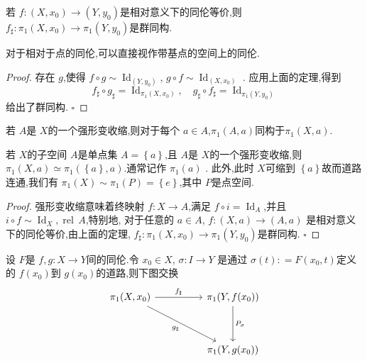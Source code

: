 \documentclass[../../几何与拓扑.tex]{subfiles}
\begin{document}
\begin{theorem}
    若 \(  f: \left( X,x_0 \right)\to \left( Y,y_0 \right)    \)是相对意义下的同伦等价,则 \(  f_{\sharp }: \pi _1 \left( X,x_0 \right)\to \pi _1 \left( Y,y_0 \right)    \)是群同构.  
\end{theorem}
\begin{note}

    对于相对于点的同伦,可以直接视作带基点的空间上的同伦.

\end{note}
\begin{proof}

    存在 \(  g  \),使得 \(  f\circ g \sim  \operatorname{Id}_{\left( Y,y_0 \right) }  \), \(  g\circ f\sim \operatorname{Id}_{\left( X,x_0 \right) }   \)   .
    应用上面的定理,得到 \[
    f_{\sharp }\circ g_{\sharp } =  \operatorname{Id}_{\pi _1 \left( X,x_0 \right) },\quad  g_{\sharp }\circ f_{\sharp }= \operatorname{Id}_{\pi _1 \left( Y,y_0 \right) }
    \]给出了群同构.
    \hfill $\square$
\end{proof}


\begin{corollary}
    若 \(  A  \)是 \(  X  \)的一个强形变收缩,则对于每个 \(  a \in A  \),\(  \pi _1 \left( A,a \right)   \)同构于\(  \pi _1 \left( X,a \right)   \).     
\end{corollary}
\begin{remark}
    若 \(  X  \)的子空间 \(  A  \)是单点集 \(  A =  \left\{ a \right\}  \),且 \(  A  \)是 \(  X  \)的一个强形变收缩,则 \(  \pi _1 \left( X,a \right)\simeq \pi _1 \left( \left\{ a \right\},a \right)    \).通常记作 \(  \pi _1 \left( a \right)   \)       .
    此外,此时 \(  X  \)可缩到 \(  \left\{ a \right\}  \)故而道路连通,我们有 \(  \pi _1 \left( X \right)\sim \pi _1 \left( P \right)=  \left\{ e \right\}    \),其中 \(  P  \)是点空间.    
\end{remark}
\begin{proof}

    强形变收缩意味着终映射  \(  f :X \to A \),满足 \( f\circ i =  \operatorname{Id}_{A}  \),并且 \(  i\circ f \sim \operatorname{Id}_{X}, \operatorname{rel}\,A  \),特别地,
    对于任意的 \(  a \in A  \), \(  f: \left( X,a \right)\to \left( A,a \right)    \)  是相对意义下的同伦等价,由上面的定理, \(  f_{\sharp }: \pi _1 \left( X,x_0 \right)\to \pi _1 \left( Y,y_0 \right)    \)是群同构. 
    \hfill $\square$
\end{proof}


\begin{theorem}
    设 \(  F  \)是 \(  f,g:X\to Y  \)间的同伦.令 \(  x_0 \in X  \), \(  \sigma : I\to Y  \)    是通过 \(  \sigma \left( t \right): =  F\left( x_0,t \right)    \)定义的 \(  f\left( x_0 \right)   \)到 \(  g\left( x_0 \right)   \)的道路,则下图交换 
    \[\begin{tikzcd}
	{\pi_1(X,x_0)} && {\pi_1(Y,f(x_0))} \\
	\\
	&& {\pi_1(Y,g(x_0))}
	\arrow["{f_\sharp}", from=1-1, to=1-3]
	\arrow["{g_\sharp}"', from=1-1, to=3-3]
	\arrow["{P_\sigma}", from=1-3, to=3-3]
\end{tikzcd}\]
  
\end{theorem}
\end{document}
